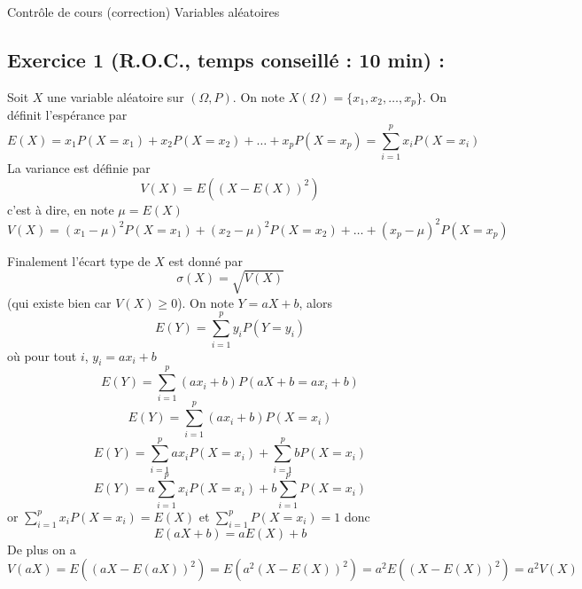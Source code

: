 

\usepackage[c]{esvect}
\newcommand{\covec}[2]{\begin{pmatrix}#1 \\#2 \end{pmatrix}}




\center
\Large Contrôle de cours (correction)
\flushleft
\center
Variables aléatoires
\flushleft \normalsize
\subsection*{Exercice 1 (R.O.C., temps conseillé : 10 min) : }
Soit $X$ une variable aléatoire sur $(\Omega,P)$. On note $X(\Omega) = \{x_1,x_2,\ldots,x_p\}$. 
On définit l'espérance par 
$$E(X) = x_1P(X=x_1) + x_2P(X=x_2) + \ldots + x_pP(X=x_p) = \sum_{i=1}^p x_i P(X=x_i)$$
La variance est définie par $$V(X) = E((X-E(X))^2)$$ c'est à dire, en note $\mu = E(X)$
$$V(X) = (x_1-\mu)^2 P(X=x_1) + (x_2-\mu)^2 P(X=x_2) + \ldots + (x_p-\mu)^2 P(X=x_p)$$ 

Finalement l'écart type de $X$ est donné par 
$$\sigma(X) = \sqrt{V(X)}$$ (qui existe bien car $V(X)\geq0$). 
On note $Y=aX+b$, alors 
$$E(Y) =  \sum_{i=1}^p y_i P(Y=y_i)$$
où pour tout $i$, $y_i =ax_i+b$
$$E(Y) =  \sum_{i=1}^p (ax_i+b) P(aX+b=ax_i+b)$$
$$E(Y) =  \sum_{i=1}^p (ax_i+b) P(X=x_i)$$
$$E(Y) =  \sum_{i=1}^p ax_iP(X=x_i) + \sum_{i=1}^p bP(X=x_i)$$
$$E(Y) =  a\sum_{i=1}^p x_iP(X=x_i) + b\sum_{i=1}^p P(X=x_i)$$
or $\displaystyle \sum_{i=1}^p x_iP(X=x_i) = E(X)$ et $\displaystyle \sum_{i=1}^p P(X=x_i) = 1$ donc 
$$\boxed{E(aX+b) = aE(X) +b}$$
De plus on a 
$$V(aX) = E((aX-E(aX))^2) = E(a^2(X-E(X))^2) = a^2E((X-E(X))^2) = a^2 V(X)$$
